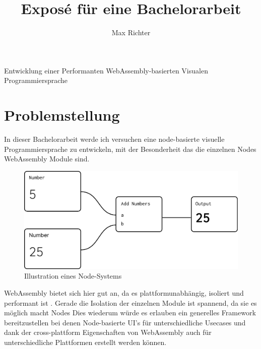 \documentclass{article}
\title{Exposé für eine Bachelorarbeit}
\author{Max Richter}
\begin{document}
\pagestyle{fancy}
\fancyhead{} %
\fancyfoot{} %
\fancyfoot[LE,RO]{\thepage}

\raggedright

\maketitle
\pagebreak

{\LARGE Entwicklung einer Performanten WebAssembly-basierten Visualen Programmiersprache}
  
\section{Problemstellung}
In dieser Bachelorarbeit werde ich versuchen eine node-basierte visuelle Programmiersprache zu entwickeln, mit der Besonderheit das die einzelnen Nodes WebAssembly Module sind.
\begin{figure}[h]
\includegraphics[width=\textwidth]{ideas/nodes.pdf}
\caption{Illustration eines Node-Systems}
\end{figure}
\linebreak
\linebreak
WebAssembly bietet sich hier gut an, da es plattformunabhängig, isoliert und performant ist \cite{Haas2017}. Gerade die Isolation der einzelnen Module ist spannend, da sie es möglich macht Nodes
\linebreak
\linebreak
Dies wiederum würde es erlauben ein generelles Framework bereitzustellen bei denen Node-basierte UI's für unterschiedliche Usecases und dank der cross-plattform Eigenschaften von WebAssembly auch für unterschiedliche Plattformen erstellt werden können.
\end{document}
